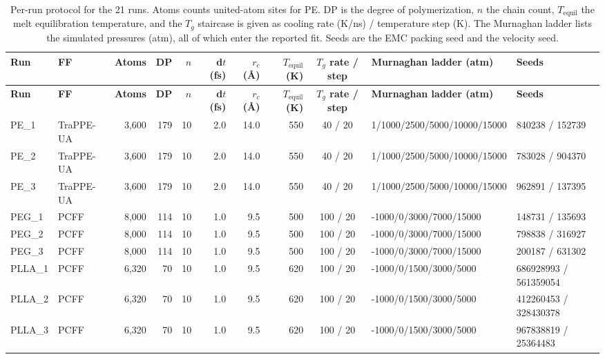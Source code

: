 \scriptsize
\begin{longtable}{l l r r r r r r c l l}
\caption{Per-run protocol for the 21 runs. Atoms counts united-atom sites for PE. DP is the degree of polymerization, $n$ the chain count, $T_{\mathrm{equil}}$ the melt equilibration temperature, and the $T_g$ staircase is given as cooling rate (K/ns) / temperature step (K). The Murnaghan ladder lists the simulated pressures (atm), all of which enter the reported fit. Seeds are the EMC packing seed and the velocity seed.} \label{tab:si_per_run} \\
\toprule
\textbf{Run} & \textbf{FF} & \textbf{Atoms} & \textbf{DP} & \textbf{$n$} & \textbf{d$t$ (fs)} & \textbf{$r_c$ (\AA)} & \textbf{$T_{\mathrm{equil}}$ (K)} & \textbf{$T_g$ rate / step} & \textbf{Murnaghan ladder (atm)} & \textbf{Seeds} \\
\midrule
\endfirsthead
\toprule
\textbf{Run} & \textbf{FF} & \textbf{Atoms} & \textbf{DP} & \textbf{$n$} & \textbf{d$t$ (fs)} & \textbf{$r_c$ (\AA)} & \textbf{$T_{\mathrm{equil}}$ (K)} & \textbf{$T_g$ rate / step} & \textbf{Murnaghan ladder (atm)} & \textbf{Seeds} \\
\midrule
\endhead
\bottomrule
\endfoot
PE\_1 & TraPPE-UA & 3{,}600 & 179 & 10 & 2.0 & 14.0 & 550 & 40 / 20 & 1/1000/2500/5000/10000/15000 & 840238 / 152739 \\
PE\_2 & TraPPE-UA & 3{,}600 & 179 & 10 & 2.0 & 14.0 & 550 & 40 / 20 & 1/1000/2500/5000/10000/15000 & 783028 / 904370 \\
PE\_3 & TraPPE-UA & 3{,}600 & 179 & 10 & 2.0 & 14.0 & 550 & 40 / 20 & 1/1000/2500/5000/10000/15000 & 962891 / 137395 \\
PEG\_1 & PCFF & 8{,}000 & 114 & 10 & 1.0 & 9.5 & 500 & 100 / 20 & -1000/0/3000/7000/15000 & 148731 / 135693 \\
PEG\_2 & PCFF & 8{,}000 & 114 & 10 & 1.0 & 9.5 & 500 & 100 / 20 & -1000/0/3000/7000/15000 & 798838 / 316927 \\
PEG\_3 & PCFF & 8{,}000 & 114 & 10 & 1.0 & 9.5 & 500 & 100 / 20 & -1000/0/3000/7000/15000 & 200187 / 631302 \\
PLLA\_1 & PCFF & 6{,}320 & 70 & 10 & 1.0 & 9.5 & 620 & 100 / 20 & -1000/0/1500/3000/5000 & 686928993 / 561359054 \\
PLLA\_2 & PCFF & 6{,}320 & 70 & 10 & 1.0 & 9.5 & 620 & 100 / 20 & -1000/0/1500/3000/5000 & 412260453 / 328430378 \\
PLLA\_3 & PCFF & 6{,}320 & 70 & 10 & 1.0 & 9.5 & 620 & 100 / 20 & -1000/0/1500/3000/5000 & 967838819 / 25364483 \\

\end{longtable}
